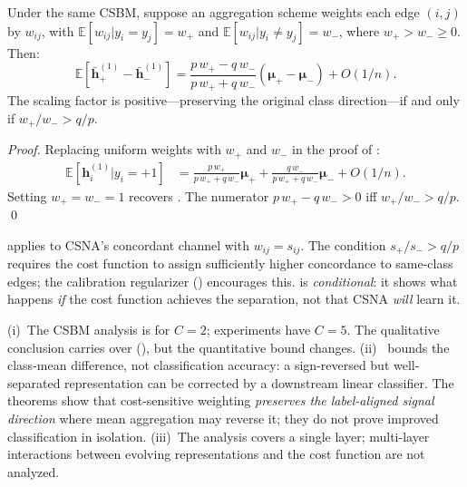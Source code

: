\documentclass[runningheads]{llncs}
\newcommand{\E}{\mathbb{E}}
\newcommand{\bh}{\mathbf{h}}
\begin{document}
\begin{theorem}\label{thm:preservation}
Under the same CSBM, suppose an aggregation scheme weights each edge $(i,j)$ by $w_{ij}$, with $\E[w_{ij} | y_i = y_j] = w_+$ and $\E[w_{ij} | y_i \neq y_j] = w_-$, where $w_+ > w_- \geq 0$.
Then:
\begin{equation}
    \E[\bar{\bh}_+^{(1)} - \bar{\bh}_-^{(1)}] = \frac{p\,w_+ - q\,w_-}{p\,w_+ + q\,w_-}(\boldsymbol{\mu}_+ - \boldsymbol{\mu}_-) + O(1/n).
\end{equation}
The scaling factor is positive---preserving the original class direction---if and only if $w_+/w_- > q/p$.
\end{theorem}

\begin{proof}
Replacing uniform weights with $w_+$ and $w_-$ in the proof of :
\begin{align}
    \E[\bh_i^{(1)} | y_i = +1] &= \frac{p\, w_+}{p\, w_+ + q\, w_-}\boldsymbol{\mu}_+ + \frac{q\, w_-}{p\, w_+ + q\, w_-}\boldsymbol{\mu}_- + O(1/n).
\end{align}
Setting $w_+=w_-=1$ recovers .
The numerator $p\,w_+ - q\,w_- > 0$ iff $w_+/w_- > q/p$. \qed
\end{proof}

\begin{remark}
 applies to CSNA's concordant channel with $w_{ij} = s_{ij}$.
The condition $s_+/s_- > q/p$ requires the cost function to assign sufficiently higher concordance to same-class edges; the calibration regularizer () encourages this.
 is \emph{conditional}: it shows what happens \emph{if} the cost function achieves the separation, not that CSNA \emph{will} learn it.
\end{remark}

\begin{remark}\label{rem:scope}
(i)~The CSBM analysis is for $C=2$; experiments have $C=5$.
The qualitative conclusion carries over (), but the quantitative bound changes.
(ii)~ bounds the class-mean difference, not classification accuracy: a sign-reversed but well-separated representation can be corrected by a downstream linear classifier.
The theorems show that cost-sensitive weighting \emph{preserves the label-aligned signal direction} where mean aggregation may reverse it; they do not prove improved classification in isolation.
(iii)~The analysis covers a single layer; multi-layer interactions between evolving representations and the cost function are not analyzed.
\end{remark}
\end{document}
